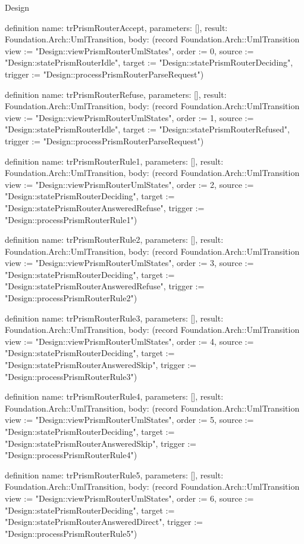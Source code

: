 \begin{lexlean}{Design}
\begin{semanticmodule}
definition{
  name: trPrismRouterAccept,
  parameters: [],
  result: Foundation.Arch::UmlTransition,
  body: (record Foundation.Arch::UmlTransition {view := "Design::viewPrismRouterUmlStates", order := 0, source := "Design::statePrismRouterIdle", target := "Design::statePrismRouterDeciding", trigger := "Design::processPrismRouterParseRequest"})
}

definition{
  name: trPrismRouterRefuse,
  parameters: [],
  result: Foundation.Arch::UmlTransition,
  body: (record Foundation.Arch::UmlTransition {view := "Design::viewPrismRouterUmlStates", order := 1, source := "Design::statePrismRouterIdle", target := "Design::statePrismRouterRefused", trigger := "Design::processPrismRouterParseRequest"})
}

definition{
  name: trPrismRouterRule1,
  parameters: [],
  result: Foundation.Arch::UmlTransition,
  body: (record Foundation.Arch::UmlTransition {view := "Design::viewPrismRouterUmlStates", order := 2, source := "Design::statePrismRouterDeciding", target := "Design::statePrismRouterAnsweredRefuse", trigger := "Design::processPrismRouterRule1"})
}

definition{
  name: trPrismRouterRule2,
  parameters: [],
  result: Foundation.Arch::UmlTransition,
  body: (record Foundation.Arch::UmlTransition {view := "Design::viewPrismRouterUmlStates", order := 3, source := "Design::statePrismRouterDeciding", target := "Design::statePrismRouterAnsweredRefuse", trigger := "Design::processPrismRouterRule2"})
}

definition{
  name: trPrismRouterRule3,
  parameters: [],
  result: Foundation.Arch::UmlTransition,
  body: (record Foundation.Arch::UmlTransition {view := "Design::viewPrismRouterUmlStates", order := 4, source := "Design::statePrismRouterDeciding", target := "Design::statePrismRouterAnsweredSkip", trigger := "Design::processPrismRouterRule3"})
}

definition{
  name: trPrismRouterRule4,
  parameters: [],
  result: Foundation.Arch::UmlTransition,
  body: (record Foundation.Arch::UmlTransition {view := "Design::viewPrismRouterUmlStates", order := 5, source := "Design::statePrismRouterDeciding", target := "Design::statePrismRouterAnsweredSkip", trigger := "Design::processPrismRouterRule4"})
}

definition{
  name: trPrismRouterRule5,
  parameters: [],
  result: Foundation.Arch::UmlTransition,
  body: (record Foundation.Arch::UmlTransition {view := "Design::viewPrismRouterUmlStates", order := 6, source := "Design::statePrismRouterDeciding", target := "Design::statePrismRouterAnsweredDirect", trigger := "Design::processPrismRouterRule5"})
}


\end{semanticmodule}
\end{lexlean}
